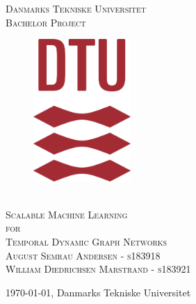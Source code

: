 \documentclass[11pt]{article}
\begin{document}
\begin{titlepage}
\center %
\textsc{\LARGE Danmarks Tekniske Universitet}
\\[1cm]
\textsc{\huge{Bachelor Project}}
\\[1cm]
\begin{figure}[H]
    \centering
    \includegraphics[width=10em]{dtu_logo.png}
\end{figure}
\\[2cm]
\textsc{\huge{Scalable Machine Learning}}
\\[0.5cm] 
\textsc{\huge{for}}
\\[0.5cm] 
\textsc{\huge{Temporal Dynamic Graph Networks}}
\\[1.0cm]
\textsc{August Semrau Andersen - s183918
\\ William Diedrichsen Marstrand - s183921} 
\\[10pt]

\medskip
\null
\vfill
\vspace{0.5cm}
\begin{center}
\today,
 Danmarks Tekniske Universitet\\
\end{center}
\end{titlepage}


\newpage
{}




\newpage
\tableofcontents
\clearpage



\clearpage
\end{document}
